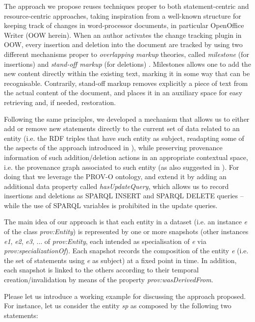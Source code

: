 \documentclass[runningheads,a4paper]{llncs}
\begin{document}
The approach we propose reuses techniques proper to both statement-centric and resource-centric approaches, taking inspiration from a well-known structure for keeping track of changes in word-processor documents, in particular OpenOffice Writer (OOW herein). When an author activates the change tracking plugin in OOW, every insertion and deletion into the document are tracked by using two different mechanisms proper to {\em overlapping markup} theories, called {\em milestone} (for insertions) and {\em stand-off markup} (for deletions)  \cite{__RefNumPara__17979_1591320820}. Milestones allows one to add the new content directly within the existing text, marking it in some way that can be recognisable. Contrarily, stand-off markup removes explicitly a piece of text from the actual content of the document, and places it in an auxiliary space for easy retrieving and, if needed, restoration.

Following the same principles, we developed a mechanism that allows us to either add or remove new statements directly to the current set of data related to an entity (i.e. the RDF triples that have such entity as subject, readapting some of the aspects of the approach introduced in  \cite{__RefNumPara__1876_1802243057}), while preserving provenance information of such addition/deletion actions in an appropriate contextual space, i.e. the provenance graph associated to such entity (as also suggested in  \cite{__RefNumPara__2188_1802243057}). For doing that we leverage the PROV-O  \cite{__RefNumPara__17349_1591320820} ontology, and extend it by adding an additional data property called {\em hasUpdateQuery}, which allows us to record insertions and deletions as SPARQL INSERT and SPARQL DELETE queries -- while the use of SPARQL variables is prohibited in the update queries.

The main idea of our approach is that each entity in a dataset (i.e. an instance {\em e} of the class {\em prov:Entity}) is represented by one or more snapshots (other instances {\em e1}, {\em e2}, {\em e3}, ... of {\em prov:Entity}, each intended as specialisation of {\em e} via {\em prov:specializationOf}). Each snapshot records the composition of the entity {\em e} (i.e. the set of statements using {\em e} as subject) at a fixed point in time. In addition, each snapshot is linked to the others according to their temporal creation/invalidation by means of the property {\em prov:wasDerivedFrom}. 

Please let us introduce a working example for discussing the approach proposed. For instance, let us consider the entity {\em sp} as composed by the following two statements:
\end{document}
